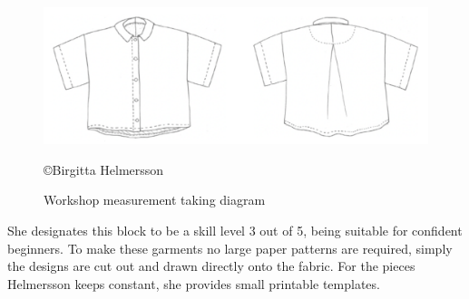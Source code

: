 \begin{figure} [H] %
    \centering %
    \includegraphics[width = \textwidth]{Images/finishedgarmentsilhoutte.png} %
    \caption{Workshop measurement taking diagram}
    \copyright {Birgitta Helmersson} %
\end{figure}
She designates this block to be a skill level 3 out of 5, being suitable for confident beginners. To make these garments no large paper patterns are required, simply the designs are cut out and drawn directly onto the fabric. For the pieces Helmersson keeps constant, she provides small printable templates.

